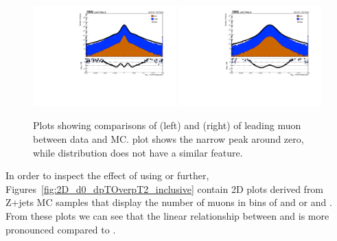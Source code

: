 \begin{figure}[h!]
    \centering
    \includegraphics[width=0.49\textwidth]{images_geofit/d0_PV_data_MC_comp.pdf}
    \includegraphics[width=0.49\textwidth]{images_geofit/d0_BS_data_MC_comp.pdf}
    \caption{Plots showing comparisons of \dzeroPV (left) and \dzeroBS (right) of leading muon between data and MC. \dzeroPV plot shows the narrow peak around zero, while \dzeroBS distribution does not have a similar feature.}
    \label{fig:d0_data_MC_comparisons}
\end{figure}

In order to inspect the effect of using \dzeroPV or \dzeroBS further, Figures~\ref{fig:2D_d0_dpTOverpT2_inclusive} contain 2D plots derived from Z+jets MC samples that display the number of muons in bins of \dptoverptsquare and \dzeroPV or \dptoverptsquare and \dzeroBS. From these plots we can see that the linear relationship between \dptoverptsquare and \dzeroBS is more pronounced compared to \dzeroPV. 

